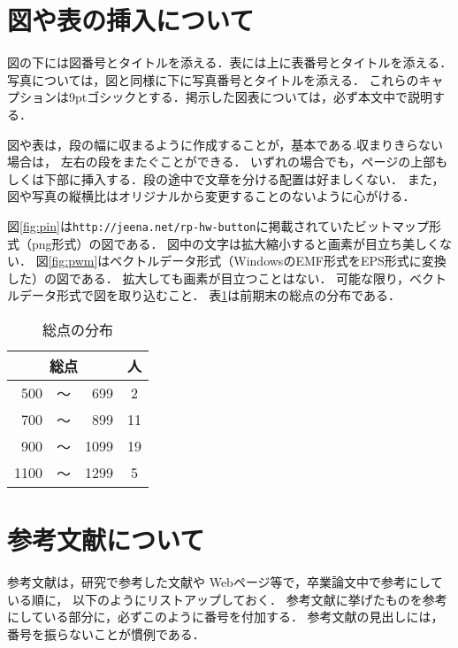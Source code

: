 \documentclass[twocolumn,fleqn]{jsarticle}
\begin{document}
%

\section{図や表の挿入について}
図の下には図番号とタイトルを添える．表には上に表番号とタイトルを添える．
写真については，図と同様に下に写真番号とタイトルを添える．
これらのキャプションは9ptゴシックとする．掲示した図表については，必ず本文中で説明する．

図や表は，段の幅に収まるように作成することが，基本である.収まりきらない場合は，
左右の段をまたぐことができる．
いずれの場合でも，ページの上部もしくは下部に挿入する．段の途中で文章を分ける配置は好ましくない．
また，図や写真の縦横比はオリジナルから変更することのないように心がける．

図\ref{fig:pin}は\verb|http://jeena.net/rp-hw-button|に掲載されていたビットマップ形式（png形式）の図である．
図中の文字は拡大縮小すると画素が目立ち美しくない．
\mbox{図\ref{fig:pwm}}はベクトルデータ形式（WindowsのEMF形式をEPS形式に変換した）の図である．
拡大しても画素が目立つことはない．
可能な限り，ベクトルデータ形式で図を取り込むこと．
表\ref{tbl:tbl1}は前期末の総点の分布である．
\begin{table}[tb]
\begin{center}
\caption{総点の分布}
\label{tbl:tbl1}
\begin{tabular}{|rcr|c|}\hline
\multicolumn{3}{|c|}{総点}&人\\\hline\hline
 500&～& 699&2\\\hline
 700&～& 899&11\\\hline
 900&～&1099&19\\\hline
1100&～&1299&5\\\hline
\end{tabular}
\end{center}
\end{table}%

\section{参考文献について}
参考文献は，研究で参考した文献や Webページ等で，卒業論文中で参考にしている順に，
以下のようにリストアップしておく．
参考文献に挙げたものを参考にしている部分に，必ずこのように番号を付加する\cite{長尾}．
参考文献の見出しには，番号を振らないことが慣例である．
\end{document}
